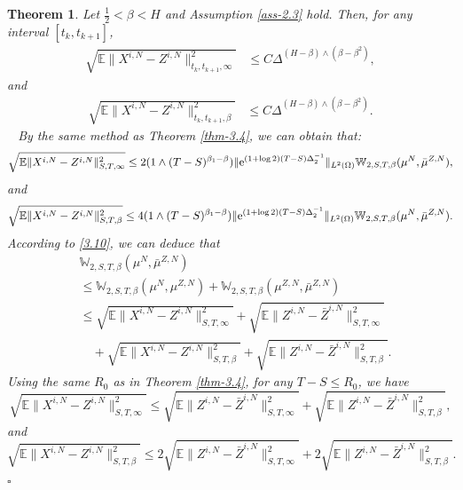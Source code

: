\documentclass[12pt]{article}
\newtheorem{theorem}{Theorem}[section]
\def\E{\mathbb E}
\def\e{\text{\rm{e}}}
\def\W{\mathbb{W}}
\newenvironment{proof}{{\noindent\it Proof.}\ }{\hfill $\square$\par}
\numberwithin{equation}{section}
\begin{document}
\begin{theorem}\label{thm-4.3}
	Let $\frac{1}{2}<\beta<H$ and Assumption \ref{ass-2.3} hold. Then, for any interval $[t_k,t_{k+1}]$,
	\begin{equation}
		\begin{aligned}
			\sqrt{\E\|X^{i,N}- Z^{i,N}\|^2_{t_k,t_{k+1},\infty}}
			&\leq C\Delta^{(H-\beta)\wedge (\beta-\beta^2)},
		\end{aligned}
	\end{equation}
	and \begin{equation}
		\begin{aligned}
			\sqrt{\E\|X^{i,N}- Z^{i,N}\|^2_{t_k,t_{k+1},\beta}}
			&\leq C\Delta^{(H-\beta)\wedge (\beta-\beta^2)}.
		\end{aligned}
	\end{equation}
	\begin{proof}
By the same method as Theorem \ref{thm-3.4}, we can obtain that:
		\begin{align*}
			\sqrt{\E\|X^{i,N}- Z^{i,N}\|^2_{S,T,\infty}}\leq 2(1\wedge (T-S)^{\beta_1-\beta})
			\|\e^{(1+\log 2)(T-S)\Delta_2^{-1}}\|_{L^2(\Omega)}\W_{2,S,T,\beta}(\mu^N,\bar \mu^{Z,N}),
		\end{align*}
		and
		\begin{align*}
			\sqrt{\E\|X^{i,N}- Z^{i,N}\|^2_{S,T,\beta}}\leq 4(1\wedge (T-S)^{\beta_1-\beta})
			\|\e^{(1+\log 2)(T-S)\Delta_2^{-1}}\|_{L^2(\Omega)}\W_{2,S,T,\beta}(\mu^N,\bar \mu^{Z,N}).
		\end{align*}
		According to \eqref{3.10}, we can deduce that
		\begin{align*}
			&\W_{2,S,T,\beta}(\mu^N,\bar \mu^{Z,N})\\
			&\leq \W_{2,S,T,\beta}(\mu^N, \mu^{Z,N})+\W_{2,S,T,\beta}(\mu^{Z,N},\bar \mu^{Z,N})\\
			&\leq \sqrt{\E\|X^{i,N}- Z^{i,N}\|^2_{S,T,\infty}}+\sqrt{\E\|Z^{i,N}-\bar Z^{i,N}\|^2_{S,T,\infty}}\\
			&\quad+\sqrt{\E\|X^{i,N}- Z^{i,N}\|^2_{S,T,\beta}}+\sqrt{\E\|Z^{i,N}-\bar Z^{i,N}\|^2_{S,T,\beta}}.
		\end{align*}
		Using the same $R_0$ as in Theorem \ref{thm-3.4},	 for any $T-S\leq R_0$, we have
		\begin{equation}
			\sqrt{\E\|X^{i,N}- Z^{i,N}\|^2_{S,T,\infty}}\leq \sqrt{\E\|Z^{i,N}-\bar Z^{i,N}\|^2_{S,T,\infty}}+\sqrt{\E\|Z^{i,N}-\bar Z^{i,N}\|^2_{S,T,\beta}},
		\end{equation}
		and \begin{equation}
			\sqrt{\E\|X^{i,N}- Z^{i,N}\|^2_{S,T,\beta}}\leq 2\sqrt{\E\|Z^{i,N}-\bar Z^{i,N}\|^2_{S,T,\infty}}+2\sqrt{\E\|Z^{i,N}-\bar Z^{i,N}\|^2_{S,T,\beta}}.

\end{equation}
\end{proof}
\end{theorem}
\end{document}
